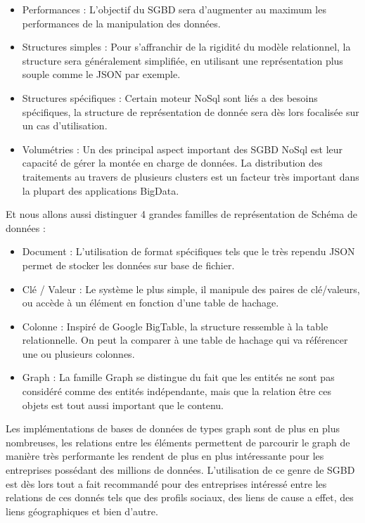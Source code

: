 \documentclass[a4paper,fleqn,12pt]{report}
\begin{document}
\begin{itemize}
\item Performances : L'objectif du SGBD sera d'augmenter au maximum les performances de la manipulation des données. 
\item Structures simples : Pour s'affranchir de la rigidité du modèle relationnel, la structure sera généralement simplifiée, en utilisant une représentation plus souple comme le JSON par exemple.
\item Structures spécifiques : Certain moteur NoSql sont liés a des besoins spécifiques, la structure de représentation de donnée sera dès lors focalisée sur un cas d'utilisation.
\item Volumétries : Un des principal aspect important des SGBD NoSql est leur capacité de gérer la montée en charge de données. La distribution des traitements au travers de plusieurs clusters est un facteur très important dans la plupart des applications BigData.
\end{itemize} 

Et nous allons aussi distinguer 4 grandes familles de représentation de Schéma de données :

\begin{itemize}
\item Document : L'utilisation de format spécifiques tels que le très rependu JSON permet de stocker les données sur base de fichier.
\item Clé / Valeur : Le système le plus simple, il manipule des paires de clé/valeurs, ou accède à un élément en fonction d'une table de hachage.
\item Colonne : Inspiré de Google BigTable, la structure ressemble à la table relationnelle. On peut la comparer à une table de hachage qui va référencer une ou plusieurs colonnes.
\item Graph : La famille Graph se distingue du fait que les entités ne sont pas considéré comme des entités indépendante, mais que la relation être ces objets est tout aussi important que le contenu.
\end{itemize} 

Les implémentations de bases de données de types graph sont de plus en plus nombreuses, les relations entre les éléments permettent de parcourir le graph de manière très performante les rendent de plus en plus intéressante pour les entreprises possédant des millions de données. L'utilisation de ce genre de SGBD est dès lors tout a fait recommandé pour des entreprises intéressé entre les relations de ces donnés tels que des profils sociaux, des liens de cause a effet, des liens géographiques et bien d'autre.
\end{document}
